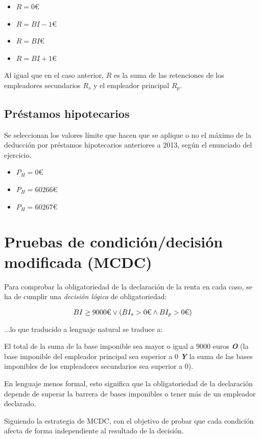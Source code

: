 \begin{itemize}
	\item $R = 0$€
	\item $R = BI - 1$€
	\item $R = BI$€
	\item $R = BI + 1$€
\end{itemize}

Al igual que en el caso anterior, $R$ es la suma de las retenciones de los empleadores secundarios
$R_{s}$ y el empleador principal $R_{p}$.

\subsection{Préstamos hipotecarios}
Se seleccionan los valores límite que hacen que se aplique o no el máximo de la deducción por préstamos
hipotecarios anteriores a 2013, según el enunciado del ejercicio.

\begin{itemize}
	\item $P_{H} = 0$€
	\item $P_{H} = 60266$€
	\item $P_{H} = 60267$€
\end{itemize}

\newpage{}
\section{Pruebas de condición/decisión modificada (MCDC)}
Para comprobar la obligatoriedad de la declaración de la renta en cada caso,
se ha de cumplir una \textit{decisión lógica} de obligatoriedad:

$$
BI\geq 9000\textup{€} \lor (BI_{s} > 0\textup{€} \land BI_{p} > 0\textup{€})
$$

...lo que traducido a lenguaje natural se traduce a:

El total de la suma de la base imponible sea mayor o igual a 9000 euros \textbf{\textit{O}}
(la base imponible del empleador principal sea superior a 0 \textbf{\textit{Y}}
la suma de las bases imponibles de los empleadores secundarios sea superior a 0).

En lenguaje menos formal, esto significa que la obligatoriedad de la declaración depende de
superar la barrera de bases imponibles o tener más de un empleador declarado.

Siguiendo la estrategia de MCDC, con el objetivo de probar que cada condición afecta de forma
independiente al resultado de la decisión.

